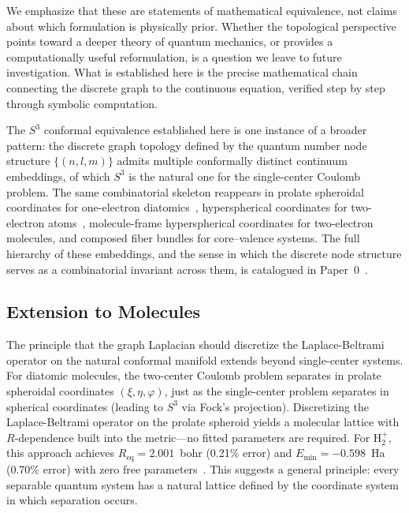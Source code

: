\documentclass[aps,pra,twocolumn,superscriptaddress,longbibliography]{revtex4-2}
\begin{document}
We emphasize that these are statements of mathematical equivalence, not claims about which formulation is physically prior. Whether the topological perspective points toward a deeper theory of quantum mechanics, or provides a computationally useful reformulation, is a question we leave to future investigation. What is established here is the precise mathematical chain connecting the discrete graph to the continuous equation, verified step by step through symbolic computation.

The $S^3$ conformal equivalence established here is one instance of a broader pattern: the discrete graph topology defined by the quantum number node structure $\{(n, l, m)\}$ admits multiple conformally distinct continuum embeddings, of which $S^3$ is the natural one for the single-center Coulomb problem.  The same combinatorial skeleton reappears in prolate spheroidal coordinates for one-electron diatomics~\cite{loutey_paper11}, hyperspherical coordinates for two-electron atoms~\cite{loutey_paper13}, molecule-frame hyperspherical coordinates for two-electron molecules, and composed fiber bundles for core--valence systems.  The full hierarchy of these embeddings, and the sense in which the discrete node structure serves as a combinatorial invariant across them, is catalogued in Paper~0~\cite{loutey_paper0}.

\subsection{Extension to Molecules}

The principle that the graph Laplacian should discretize the Laplace-Beltrami operator on the natural conformal manifold extends beyond single-center systems.  For diatomic molecules, the two-center Coulomb problem separates in prolate spheroidal coordinates $(\xi, \eta, \varphi)$, just as the single-center problem separates in spherical coordinates (leading to $S^3$ via Fock's projection).  Discretizing the Laplace-Beltrami operator on the prolate spheroid yields a molecular lattice with $R$-dependence built into the metric---no fitted parameters are required.  For H$_2^+$, this approach achieves $R_{\mathrm{eq}} = 2.001$~bohr (0.21\% error) and $E_{\min} = -0.598$~Ha (0.70\% error) with zero free parameters~\cite{loutey_paper11}.  This suggests a general principle: every separable quantum system has a natural lattice defined by the coordinate system in which separation occurs.


\end{document}
